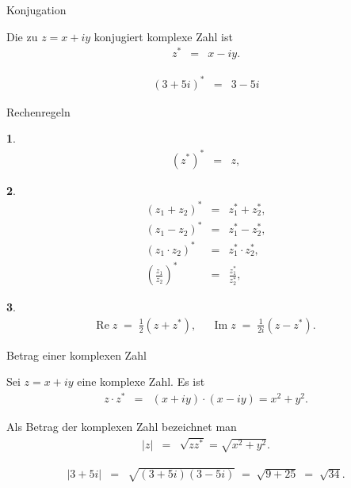 \documentclass[german]{beamer}
\newcommand{\bq}{\begin{eqnarray*}}
\newcommand{\eq}{\end{eqnarray*}}
\newtheorem*{myemptytheorem}{}
\begin{document}
\begin{frame}{Konjugation}

\begin{definition}
Die zu $z=x+iy$ \alert{konjugiert komplexe Zahl} ist
\bq
 z^\ast & = & x-iy.
\eq
\end{definition}

\begin{example}
\bq
 \left( 3 + 5 i \right)^\ast & = & 3 - 5 i
\eq
\end{example}

\end{frame}

\begin{frame}{Rechenregeln}

\begin{myemptytheorem}
\bq
 \left( z^\ast \right)^\ast & = & z,
\eq
\end{myemptytheorem}

\begin{myemptytheorem}
\bq
 \left( z_1 + z_2 \right)^\ast & = & z_1^\ast + z_2^\ast,
 \nonumber \\
 \left( z_1 - z_2 \right)^\ast & = & z_1^\ast - z_2^\ast,
 \nonumber \\
 \left( z_1 \cdot z_2 \right)^\ast & = & z_1^\ast \cdot z_2^\ast,
 \nonumber \\
 \left( \frac{z_1}{z_2} \right)^\ast & = & \frac{z_1^\ast}{z_2^\ast},
\eq
\end{myemptytheorem}

\begin{myemptytheorem}
\bq
 \mathrm{Re}\;z \; = \; \frac{1}{2} \left( z + z^\ast \right),
 & &
 \mathrm{Im}\;z \; = \; \frac{1}{2i} \left( z - z^\ast \right).
\eq
\end{myemptytheorem}

\end{frame}

\begin{frame}{Betrag einer komplexen Zahl}

Sei $z=x+iy$ eine komplexe Zahl. 
Es ist
\bq
 z \cdot z^\ast & = & (x+iy) \cdot (x-iy) = x^2 + y^2.
\eq
\begin{definition}
Als \alert{Betrag} der komplexen Zahl bezeichnet man
\bq
 \left| z \right| & = & \sqrt{ z z^\ast} = \sqrt{x^2+y^2}.
\eq
\end{definition}
\begin{example}
\bq
 \left| 3+5i \right| & = & \sqrt{\left(3+5i\right)\left(3-5i\right)}
 \; = \; \sqrt{9+25} \; = \; \sqrt{34}.
\eq
\end{example}

\end{frame}
\end{document}
